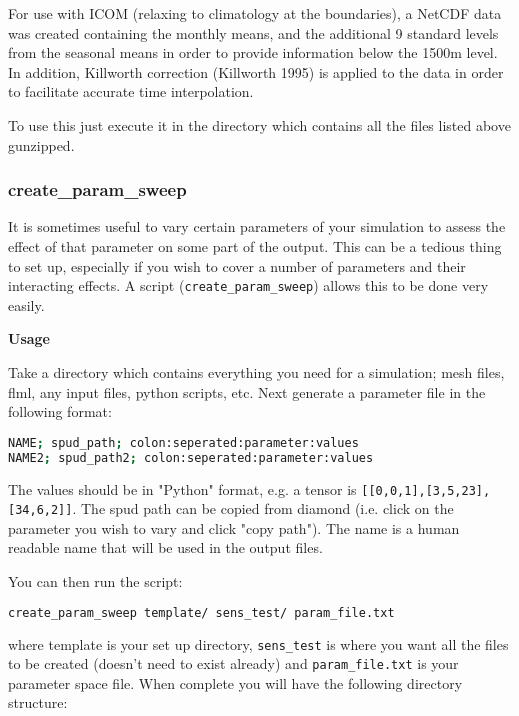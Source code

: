 For use with ICOM (relaxing to climatology at the boundaries), a NetCDF data was created containing the monthly means, and the additional 9 standard levels from the seasonal means in order to provide information below the 1500m level. In addition, Killworth correction (Killworth 1995) is applied to the data in order to facilitate accurate time interpolation.

To use this just execute it in the directory which contains all the files listed above gunzipped.

\subsubsection{create\_param\_sweep}
\label{sec:create_param_sweep}

It is sometimes useful to vary certain parameters of your simulation to assess the effect of
that parameter on some part of the output. This can be a tedious thing to set up, especially
if you wish to cover a number of parameters and their interacting effects.
A script (\lstinline[language = Bash]+create_param_sweep+) allows this to be done very easily.

\textbf{Usage}

Take a directory which contains everything you need for a simulation; mesh files,
flml, any input files, python scripts, etc. Next generate a parameter file in the following format:

\begin{lstlisting}[language = Bash]
NAME; spud_path; colon:seperated:parameter:values
NAME2; spud_path2; colon:seperated:parameter:values
\end{lstlisting}

The values should be in "Python" format, e.g. a tensor is
\lstinline[language = Bash]+[[0,0,1],[3,5,23],[34,6,2]]+.
The spud path can be copied from diamond (i.e. click on the parameter you wish to vary
and click "copy path"). The name is a human readable name that will be used in the output files.

You can then run the script:

\begin{lstlisting}[language = Bash]
create_param_sweep template/ sens_test/ param_file.txt
\end{lstlisting}

where template is your set up directory, \lstinline[language = Bash]+sens_test+
is where you want all the files to be created
(doesn't need to exist already) and \lstinline[language = Bash]+param_file.txt+ is your parameter space file.
When complete you will have the following directory structure:

